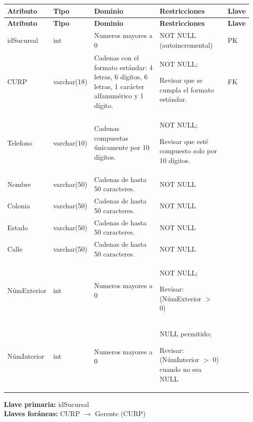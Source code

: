 \documentclass[12pt]{article}
\begin{document}
\begin{longtable}{p{2.2cm} p{2.2cm} p{5.8cm} p{4.2cm} p{1.2cm}}
\label{tab:sucursal}\\
\toprule
\textbf{Atributo} & \textbf{Tipo} & \textbf{Dominio} & \textbf{Restricciones} & \textbf{Llave} \\
\midrule
\endfirsthead

\toprule
\textbf{Atributo} & \textbf{Tipo} & \textbf{Dominio} & \textbf{Restricciones} & \textbf{Llave} \\
\midrule
\endhead

\bottomrule
\endfoot


idSucursal 
& int 
& Numeros mayores a 0
& NOT NULL (autoincremental)
& PK \\

CURP 
& varchar(18) 
& Cadenas con el formato estándar: 4 letras, 6 dígitos, 6 letras, 1 carácter alfanumérico y 1 dígito.
& NOT NULL;

Revisar que se cumpla el formato estándar.
& FK \\

Telefono 
& varchar(10) 
& Cadenas compuestas únicamente por 10 dígitos.
& NOT NULL;

Revisar que esté compuesto solo por 10 dígitos.
&  \\

Nombre 
& varchar(50) 
& Cadenas de hasta 50 caracteres.
& NOT NULL
&  \\

Colonia 
& varchar(50) 
& Cadenas de hasta 50 caracteres.
& NOT NULL
&  \\

Estado 
& varchar(50) 
& Cadenas de hasta 50 caracteres.
& NOT NULL
&  \\

Calle 
& varchar(50) 
& Cadenas de hasta 50 caracteres.
& NOT NULL
&  \\

NúmExterior 
& int 
& Numeros mayores a 0
& NOT NULL;

Revisar: (NúmExterior $>$ 0)
&  \\

NúmInterior 
& int 
& Numeros mayores a 0
& NULL permitido;

Revisar: (NúmInterior $>$ 0) cuando no sea NULL
&  \\

\end{longtable}

\textbf{Llave primaria:} idSucursal\\
\textbf{Llaves foráneas:} CURP $\rightarrow$ Gerente (CURP)
\end{document}
